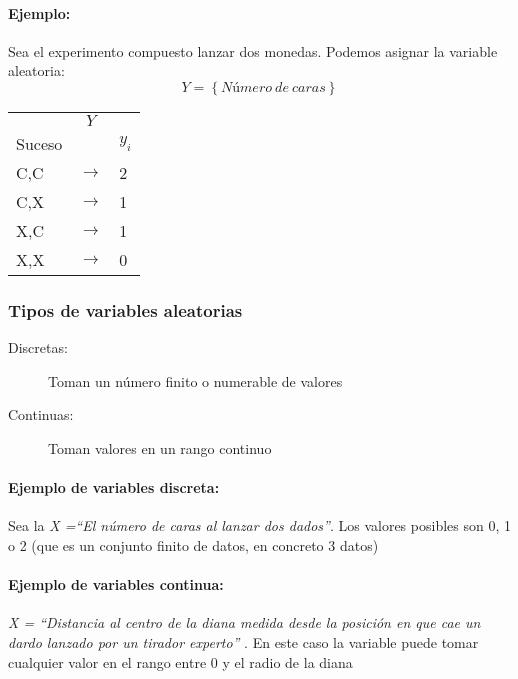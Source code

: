 \hypertarget{ejemplo-1}{%
\paragraph{Ejemplo:}\label{ejemplo-1}}

Sea el experimento compuesto lanzar dos monedas. Podemos asignar la
variable aleatoria: \[Y=\left\lbrace Número \ de \ caras \right\rbrace\]

\begin{longtable}[]{@{}lcl@{}}
\toprule
\endhead
& \(Y\) &\tabularnewline
Suceso & & \(y_i\)\tabularnewline
C,C & \(\rightarrow\) & 2\tabularnewline
C,X & \(\rightarrow\) & 1\tabularnewline
X,C & \(\rightarrow\) & 1\tabularnewline
X,X & \(\rightarrow\) & 0\tabularnewline
\bottomrule
\end{longtable}

\hypertarget{tipos-de-variables-aleatorias}{%
\subsubsection{Tipos de variables
aleatorias}\label{tipos-de-variables-aleatorias}}

\begin{description}
\item[Discretas:]
Toman un número finito o numerable de valores
\item[Continuas:]
Toman valores en un rango continuo
\end{description}

\hypertarget{ejemplo-de-variables-discreta}{%
\paragraph{Ejemplo de variables
discreta:}\label{ejemplo-de-variables-discreta}}

Sea la \emph{X =``El número de caras al lanzar dos dados''}. Los valores
posibles son 0, 1 o 2 (que es un conjunto finito de datos, en concreto 3
datos)

\hypertarget{ejemplo-de-variables-continua}{%
\paragraph{Ejemplo de variables
continua:}\label{ejemplo-de-variables-continua}}

\emph{X = ``Distancia al centro de la diana medida desde la posición en
que cae un dardo lanzado por un tirador experto''} . En este caso la
variable puede tomar cualquier valor en el rango entre 0 y el radio de
la diana

